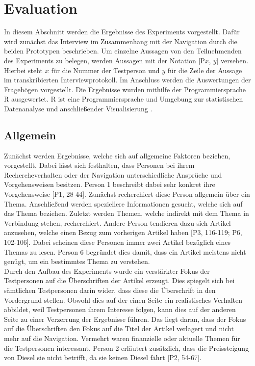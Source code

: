 \section{Evaluation}\label{sec:results}
In diesem Abschnitt werden die Ergebnisse des Experiments vorgestellt.
Dafür wird zunächst das Interview im Zusammenhang mit der Navigation durch die beiden Prototypen beschrieben.
Um einzelne Aussagen von den Teilnehmenden des Experiments zu belegen, werden Aussagen mit der Notation [P$x$, $y$] versehen.
Hierbei steht $x$ für die Nummer der Testperson und $y$ für die Zeile der Aussage im transkribierten Interviewprotokoll.
Im Anschluss werden die Auswertungen der Fragebögen vorgestellt.
Die Ergebnisse wurden mithilfe der Programmiersprache R ausgewertet.
R ist eine Programmiersprache und Umgebung zur statistischen Datenanalyse und anschließender Visualisierung \cite{rlang}.

\subsection{Allgemein}
Zunächst werden Ergebnisse, welche sich auf allgemeine Faktoren beziehen, vorgestellt.
Dabei lässt sich festhalten, dass Personen bei ihrem Rechercheverhalten oder der Navigation unterschiedliche Ansprüche und Vorgehensweisen besitzen.
Person 1 beschreibt dabei sehr konkret ihre Vorgehensweise [P1, 28-44].
Zunächst recherchiert diese Person allgemein über ein Thema.
Anschließend werden speziellere Informationen gesucht, welche sich auf das Thema beziehen.
Zuletzt werden Themen, welche indirekt mit dem Thema in Verbindung stehen, recherchiert.
Andere Person tendieren dazu sich Artikel anzusehen, welche einen Bezug zum vorherigen Artikel haben [P3, 116-119; P6, 102-106].
Dabei scheinen diese Personen immer zwei Artikel bezüglich eines Themas zu lesen.
Person 6 begründet dies damit, dass ein Artikel meistens nicht genügt, um ein bestimmtes Thema zu verstehen.\\

Durch den Aufbau des Experiments wurde ein verstärkter Fokus der Testpersonen auf die Überschriften der Artikel erzeugt.
Dies spiegelt sich bei sämtlichen Testpersonen darin wider, dass diese die Überschrift in den Vordergrund stellen.
Obwohl dies auf der einen Seite ein realistisches Verhalten abbildet, weil Testpersonen ihrem Interesse folgen, kann dies auf der anderen Seite zu einer Verzerrung der Ergebnisse führen.
Das liegt daran, dass der Fokus auf die Überschriften den Fokus auf die Titel der Artikel verlagert und nicht mehr auf die Navigation.
Vermehrt waren finanzielle oder aktuelle Themen für die Testpersonen interessant.
Person 2 erläutert zusätzlich, dass die Preissteigung von Diesel sie nicht betrifft, da sie keinen Diesel fährt [P2, 54-67].\\

